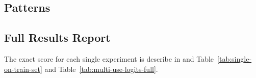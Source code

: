 \documentclass[11pt,a4paper]{article}
\begin{document}
\subsection{Patterns}
\label{apx:patterns}

\subsection{Full Results Report}
\label{apx:full-results-report}
The exact score for each single experiment is describe in and Table~\ref{tab:single-on-train-set} and Table~\ref{tab:multi-use-logits-full}.


\end{document}
